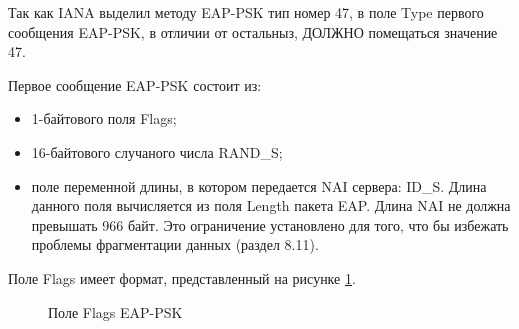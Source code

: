 Так как IANA выделил методу EAP-PSK тип номер 47, в поле Type первого сообщения EAP-PSK, в отличии от остальныз, ДОЛЖНО помещаться значение 47.

Первое сообщение EAP-PSK состоит из:

\begin{itemize}
\item 1-байтового поля Flags;
\item 16-байтового случаного числа RAND\_S;
\item поле переменной длины, в котором передается NAI сервера: ID\_S. Длина данного поля вычисляется из поля Length пакета EAP. Длина NAI не должна превышать 966 байт. Это ограничение установлено для того, что бы избежать проблемы фрагментации данных (раздел 8.11).
\end{itemize}

Поле Flags имеет формат, представленный на рисунке \ref{img:flags_field}.

\begin{figure}[h!]
\caption{Поле Flags EAP-PSK}
\label{img:flags_field}
\end{figure}
